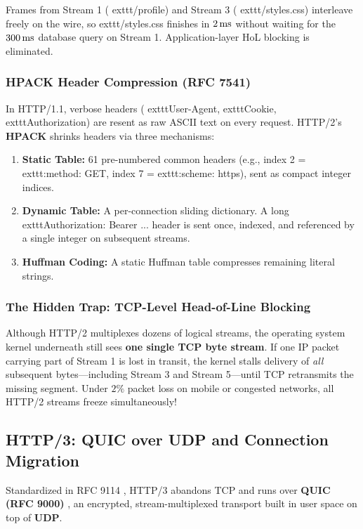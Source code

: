 Frames from Stream 1 (	exttt{/profile}) and Stream 3 (	exttt{/styles.css}) interleave freely on the wire, so 	exttt{/styles.css} finishes in $2\text{\,ms}$ without waiting for the $300\text{\,ms}$ database query on Stream 1. Application-layer HoL blocking is eliminated.

\subsubsection{HPACK Header Compression (RFC 7541)}
In HTTP/1.1, verbose headers (	exttt{User-Agent}, 	exttt{Cookie}, 	exttt{Authorization}) are resent as raw ASCII text on every request. HTTP/2's \textbf{HPACK} shrinks headers via three mechanisms:
\begin{enumerate}[leftmargin=15pt]
  \item \textbf{Static Table:} 61 pre-numbered common headers (e.g., index 2 = 	exttt{:method: GET}, index 7 = 	exttt{:scheme: https}), sent as compact integer indices.
  \item \textbf{Dynamic Table:} A per-connection sliding dictionary. A long 	exttt{Authorization: Bearer ...} header is sent once, indexed, and referenced by a single integer on subsequent streams.
  \item \textbf{Huffman Coding:} A static Huffman table compresses remaining literal strings.
\end{enumerate}

\subsubsection{The Hidden Trap: TCP-Level Head-of-Line Blocking}
Although HTTP/2 multiplexes dozens of logical streams, the operating system kernel underneath still sees \textbf{one single TCP byte stream}. If one IP packet carrying part of Stream 1 is lost in transit, the kernel stalls delivery of \emph{all} subsequent bytes---including Stream 3 and Stream 5---until TCP retransmits the missing segment. Under $2\%$ packet loss on mobile or congested networks, all HTTP/2 streams freeze simultaneously!

\subsection{HTTP/3: QUIC over UDP and Connection Migration}

Standardized in RFC 9114 \cite{rfc9114}, HTTP/3 abandons TCP and runs over \textbf{QUIC (RFC 9000)} \cite{rfc9000}, an encrypted, stream-multiplexed transport built in user space on top of \textbf{UDP}.

